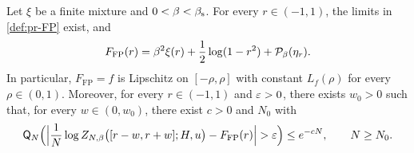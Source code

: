 \begin{proposition}\label{prop:pr-cross}
Let $\xi$ be a finite mixture and $0<\beta<\beta_{\mathrm s}$. For every $r\in(-1,1)$, the limits in \cref{def:pr-FP} exist, and
\begin{equation}\label{eq:pr-cross}
F_{\mathrm{FP}}(r)=\beta^2\xi(r)+\frac12\log(1-r^2)+\mathcal P_\beta(\eta_r).
\end{equation}
In particular, $F_{\mathrm{FP}}=f$ is Lipschitz on $[-\rho,\rho]$ with constant $L_f(\rho)$ for every $\rho\in(0,1)$. Moreover, for every $r\in(-1,1)$ and $\varepsilon>0$, there exists $w_0>0$ such that, for every $w\in(0,w_0)$, there exist $c>0$ and $N_0$ with
\begin{equation}\label{eq:pr-cross-conc}
\mathsf Q_N\Bigl(\Bigl|\frac1N\log Z_{N,\beta}\bigl([r-w,r+w];H,u\bigr)-F_{\mathrm{FP}}(r)\Bigr|>\eps\Bigr)\le e^{-cN},\qquad N\ge N_0 .
\end{equation}
\end{proposition}

